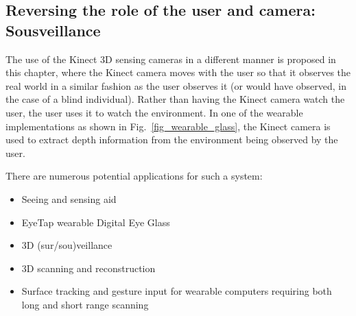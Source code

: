 \subsection{Reversing the role of the user and camera: Sousveillance}
The use of the Kinect 3D sensing cameras in a different manner is proposed in this chapter, where the Kinect camera moves with the user so that it observes the real world in a similar fashion as the user observes it (or would have observed, in the case of a blind individual). Rather than having the Kinect camera watch the user, the user uses it to watch the environment. In one of the wearable implementations as shown in Fig.~\ref{fig_wearable_glass}, the Kinect camera is used to extract depth information from the environment being observed by the user.

There are numerous potential applications for such a system:
\begin{itemize}
\item Seeing and sensing aid \cite{mann2011blind}
\item EyeTap wearable Digital Eye Glass \cite{lo2012high, mann2012hdrchitecture, mann2012realtime}
\item 3D (sur/sou)veillance 
\item 3D scanning and reconstruction \cite{izadi2011kinectfusion}
\item Surface tracking and gesture input for wearable computers requiring both long and short range scanning
\end{itemize}

